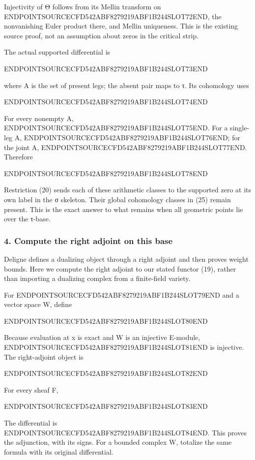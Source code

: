 Injectivity of Θ follows from its Mellin transform on ENDPOINTSOURCECFD542ABF8279219ABF1B244SLOT72END, the nonvanishing Euler product there, and Mellin uniqueness. This is the existing source proof, not an assumption about zeros in the critical strip.

The actual supported differential is

ENDPOINTSOURCECFD542ABF8279219ABF1B244SLOT73END

where A is the set of present legs; the absent pair maps to τ. Its cohomology uses

ENDPOINTSOURCECFD542ABF8279219ABF1B244SLOT74END

For every nonempty A, ENDPOINTSOURCECFD542ABF8279219ABF1B244SLOT75END. For a single-leg A, ENDPOINTSOURCECFD542ABF8279219ABF1B244SLOT76END; for the joint A, ENDPOINTSOURCECFD542ABF8279219ABF1B244SLOT77END. Therefore

ENDPOINTSOURCECFD542ABF8279219ABF1B244SLOT78END

Restriction (20) sends each of these arithmetic classes to the supported zero at its own label in the σ skeleton. Their global cohomology classes in (25) remain present. This is the exact answer to what remains when all geometric points lie over the τ-base.

\subsubsection{4. Compute the right adjoint on this base}\label{endpoint-tau_base--compute-the-right-adjoint-on-this-base}

Deligne defines a dualizing object through a right adjoint and then proves weight bounds. Here we compute the right adjoint to our stated functor (19), rather than importing a dualizing complex from a finite-field variety.

For ENDPOINTSOURCECFD542ABF8279219ABF1B244SLOT79END and a vector space W, define

ENDPOINTSOURCECFD542ABF8279219ABF1B244SLOT80END

Because evaluation at x is exact and W is an injective E-module, ENDPOINTSOURCECFD542ABF8279219ABF1B244SLOT81END is injective. The right-adjoint object is

ENDPOINTSOURCECFD542ABF8279219ABF1B244SLOT82END

For every sheaf F,

ENDPOINTSOURCECFD542ABF8279219ABF1B244SLOT83END

The differential is ENDPOINTSOURCECFD542ABF8279219ABF1B244SLOT84END. This proves the adjunction, with its signs. For a bounded complex W, totalize the same formula with its original differential.

